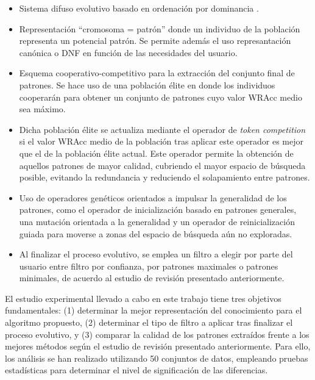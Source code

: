 \documentclass[c5paper,10pt,twoside]{book}	   	%
\begin{document}
\begin{itemize}
	\item Sistema difuso evolutivo basado en ordenación por dominancia \cite{Dapm02}. 
	
	\item Representación ``cromosoma = patrón'' donde un individuo de la población representa un potencial patrón. Se permite además el uso represantación canónica o \ac{DNF} en función de las necesidades del usuario.
	
	\item Esquema cooperativo-competitivo para la extracción del conjunto final de patrones. Se hace uso de una población élite en donde los individuos cooperarán para obtener un conjunto de patrones cuyo valor \ac{WRAcc} medio sea máximo.
	
	\item Dicha población élite se actualiza mediante el operador de \textit{token competition} \cite{Llsy92} si el valor WRAcc medio de la población tras aplicar este operador es mejor que el de la población élite actual. Este operador permite la obtención de aquellos patrones de mayor calidad, cubriendo el mayor espacio de búsqueda posible, evitando la redundancia y reduciendo el solapamiento entre patrones. 
	
	\item Uso de operadores genéticos orientados a impulsar la generalidad de los patrones, como el operador de inicialización basado en patrones generales, una mutación orientada a la generalidad y un operador de reinicialización guiada para moverse a zonas del espacio de búsqueda aún no exploradas.
	
	\item Al finalizar el proceso evolutivo, se emplea un filtro a elegir por parte del usuario entre filtro por confianza, por patrones maximales o patrones minimales, de acuerdo al estudio de revisión presentado anteriormente.
\end{itemize}

El estudio experimental llevado a cabo en este trabajo tiene tres objetivos fundamentales: (1) determinar la mejor representación del conocimiento para el algoritmo propuesto, (2) determinar el tipo de filtro a aplicar tras finalizar el proceso evolutivo, y (3) comparar la calidad de los patrones extraídos frente a los mejores métodos según el estudio de revisión presentado anteriormente. Para ello, los análisis se han realizado utilizando 50 conjuntos de datos, empleando pruebas estadísticas para determinar el nivel de significación de las diferencias.
\end{document}
